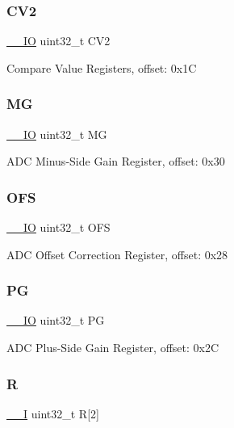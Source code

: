 \subsubsection{\texorpdfstring{CV2}{CV2}}
{\footnotesize\ttfamily \mbox{\hyperlink{core__cm0plus_8h_aec43007d9998a0a0e01faede4133d6be}{\+\_\+\+\_\+\+IO}} uint32\+\_\+t C\+V2}

Compare Value Registers, offset\+: 0x1C \mbox{\label{struct_a_d_c___type_a986be295f88a5b585ac89b5ae6a75f57}} 
\subsubsection{\texorpdfstring{MG}{MG}}
{\footnotesize\ttfamily \mbox{\hyperlink{core__cm0plus_8h_aec43007d9998a0a0e01faede4133d6be}{\+\_\+\+\_\+\+IO}} uint32\+\_\+t MG}

A\+DC Minus-\/\+Side Gain Register, offset\+: 0x30 \mbox{\label{struct_a_d_c___type_a9c229965c5de3a76f0f694f7f008bd27}} 
\subsubsection{\texorpdfstring{OFS}{OFS}}
{\footnotesize\ttfamily \mbox{\hyperlink{core__cm0plus_8h_aec43007d9998a0a0e01faede4133d6be}{\+\_\+\+\_\+\+IO}} uint32\+\_\+t O\+FS}

A\+DC Offset Correction Register, offset\+: 0x28 \mbox{\label{struct_a_d_c___type_ac25efaaa034049fd39719cfe5b8ef3a0}} 
\subsubsection{\texorpdfstring{PG}{PG}}
{\footnotesize\ttfamily \mbox{\hyperlink{core__cm0plus_8h_aec43007d9998a0a0e01faede4133d6be}{\+\_\+\+\_\+\+IO}} uint32\+\_\+t PG}

A\+DC Plus-\/\+Side Gain Register, offset\+: 0x2C \mbox{\label{struct_a_d_c___type_a2d5ff162ed91ca88f1f5ce93926a28a8}} 
\subsubsection{\texorpdfstring{R}{R}}
{\footnotesize\ttfamily \mbox{\hyperlink{core__cm0plus_8h_af63697ed9952cc71e1225efe205f6cd3}{\+\_\+\+\_\+I}} uint32\+\_\+t R\mbox{[}2\mbox{]}}

